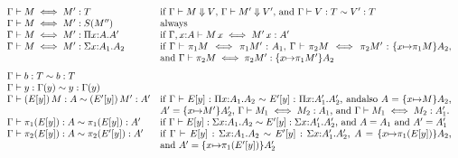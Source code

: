 \documentclass{article}
\theoremstyle{break}
\begin{document}
\[\begin{array}{lp{4.2truein}}
\aconequiv{\context}{\constructor}{\constructor'}{\ktype}&
  if
    $\headnormsto{\context}{\constructor}{\kind}{\cvalue}$,
    $\headnormsto{\context}{\constructor'}{\kind}{\cvalue'}$, and
    $\weakconequiv{\context}{\cvalue}{\ktype}{\cvalue'}{\ktype}$\\
\aconequiv{\context}{\constructor}{\constructor'}{\ksingleton{\constructor''}}&
  always\\
\aconequiv{\context}{\constructor}{\constructor'}
  {\kpi{\cvar}{\kind}{\kind'}}&
  if
  $\aconequiv{\context,\cvar{:}\kind}{\capply{\constructor}{\cvar}}
           {\capply{\constructor'}{\cvar}}{\kind'}$\\ %
\aconequiv{\context}{\constructor}{\constructor'}
  {\ksigma{\cvar}{\kind_1}{\kind_2}}&
  if
  $\aconequiv{\context}{\cpi{1}{\constructor}}
     {\cpi{1}{\constructor'}}{\kind_1}$, %
  $\aconequiv{\context}{\cpi{2}{\constructor}}
           {\cpi{2}{\constructor'}}
           {\substitute{\cvar}{\cpi{1}{\constructor}}\kind_2}$, and
  $\aconequiv{\context}{\cpi{2}{\constructor}}
           {\cpi{2}{\constructor'}}
           {\substitute{\cvar}{\cpi{1}{\constructor'}}\kind_2}$\\[7pt]

\weakconequiv{\context}{\basetype}{\ktype}{\basetype}{\ktype}\\
\weakconequiv{\context}{\othercvar}{\context(\othercvar)}
    {\othercvar}{\context(\othercvar)}\\
\weakconequiv{\context}{\capply{(E[\othercvar])}{\constructor}}{\kind}
  {\capply{(E'[\othercvar])}{\constructor'}}{\kind'}&
  if 
  $\weakconequiv{\context}{E[\othercvar]}
    {\kpi{\cvar}{\kind_1}{\kind_2}}
    {E'[\othercvar]}
    {\kpi{\cvar}{\kind'_1}{\kind'_2}}$,
  andalso
  $\kind = \substitute{\cvar}{\constructor}{\kind_2}$,
  $\kind' = \substitute{\cvar}{\constructor'}{\kind'_2}$,
  $\aconequiv{\context}{\constructor_1}{\constructor_2}{\kind_1}$, and
  $\aconequiv{\context}{\constructor_1}{\constructor_2}{\kind'_1}$.\\
\weakconequiv{\context}{\cpi{1}{(E[\othercvar])}}{\kind}
  {\cpi{1}{(E[\othercvar])}}{\kind'}&
  if $\weakconequiv{\context}{E[\othercvar]}
    {\ksigma{\cvar}{\kind_1}{\kind_2}}
    {E'[\othercvar]}
    {\ksigma{\cvar}{\kind'_1}{\kind'_2}}$,
  and
  $\kind = \kind_1$ and $\kind' = \kind'_1$\\
\weakconequiv{\context}{\cpi{2}{(E[\othercvar])}}{\kind}
  {\cpi{2}{(E'[\othercvar])}}{\kind'}&
  if $\weakconequiv{\context}{E[\othercvar]}
    {\ksigma{\cvar}{\kind_1}{\kind_2}}
    {E'[\othercvar]}
    {\ksigma{\cvar}{\kind'_1}{\kind'_2}}$,
  $\kind = \substitute{\cvar}{\cpi{1}{(E[\othercvar])}}{\kind_2}$, and
  $\kind' = \substitute{\cvar}{\cpi{1}{(E'[\othercvar])}}{\kind'_2}$\\[7pt]


\end{array}\]
\end{document}
